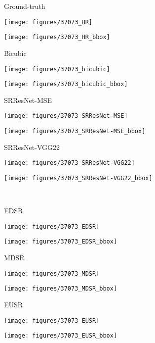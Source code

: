 \documentclass[runningheads]{llncs}
\begin{document}
\begin{figure*}[]
	\centering
	\begin{minipage}[b]{0.24\linewidth}
		\centering
		\centerline{\scriptsize{Ground-truth}}\medskip
		\centerline{\texttt{[image: figures/37073\_HR]}}\smallskip
		\centerline{\texttt{[image: figures/37073\_HR\_bbox]}}
	\end{minipage}
	\begin{minipage}[b]{0.24\linewidth}
		\centering
		\centerline{\scriptsize{Bicubic}}\medskip
		\centerline{\texttt{[image: figures/37073\_bicubic]}}\smallskip
		\centerline{\texttt{[image: figures/37073\_bicubic\_bbox]}}
	\end{minipage}
	\begin{minipage}[b]{0.24\linewidth}
		\centering
		\centerline{\scriptsize{SRResNet-MSE}}\medskip
		\centerline{\texttt{[image: figures/37073\_SRResNet-MSE]}}\smallskip
		\centerline{\texttt{[image: figures/37073\_SRResNet-MSE\_bbox]}}
	\end{minipage}
	\begin{minipage}[b]{0.24\linewidth}
		\centering
		\centerline{\scriptsize{SRResNet-VGG22}}\medskip
		\centerline{\texttt{[image: figures/37073\_SRResNet-VGG22]}}\smallskip
		\centerline{\texttt{[image: figures/37073\_SRResNet-VGG22\_bbox]}}
	\end{minipage}
	\medskip \\ \medskip
	\begin{minipage}[b]{0.24\linewidth}
		\centering
		\centerline{\scriptsize{EDSR}}\medskip
		\centerline{\texttt{[image: figures/37073\_EDSR]}}\smallskip
		\centerline{\texttt{[image: figures/37073\_EDSR\_bbox]}}
	\end{minipage}
	\begin{minipage}[b]{0.24\linewidth}
		\centering
		\centerline{\scriptsize{MDSR}}\medskip
		\centerline{\texttt{[image: figures/37073\_MDSR]}}\smallskip
		\centerline{\texttt{[image: figures/37073\_MDSR\_bbox]}}
	\end{minipage}
	\begin{minipage}[b]{0.24\linewidth}
		\centering
		\centerline{\scriptsize{EUSR}}\medskip
		\centerline{\texttt{[image: figures/37073\_EUSR]}}\smallskip
		\centerline{\texttt{[image: figures/37073\_EUSR\_bbox]}}
	\end{minipage}

\end{figure*}
\end{document}
